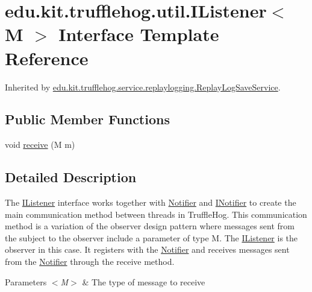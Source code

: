 \hypertarget{interfaceedu_1_1kit_1_1trufflehog_1_1util_1_1_i_listener}{}\section{edu.\+kit.\+trufflehog.\+util.\+I\+Listener$<$ M $>$ Interface Template Reference}
\label{interfaceedu_1_1kit_1_1trufflehog_1_1util_1_1_i_listener}


Inherited by \hyperlink{classedu_1_1kit_1_1trufflehog_1_1service_1_1replaylogging_1_1_replay_log_save_service}{edu.\+kit.\+trufflehog.\+service.\+replaylogging.\+Replay\+Log\+Save\+Service}.

\subsection*{Public Member Functions}
\begin{DoxyCompactItemize}
\item 
void \hyperlink{interfaceedu_1_1kit_1_1trufflehog_1_1util_1_1_i_listener_a052500b6cbdc4d0087fc44591fe32bc1}{receive} (M m)
\end{DoxyCompactItemize}


\subsection{Detailed Description}
The \hyperlink{interfaceedu_1_1kit_1_1trufflehog_1_1util_1_1_i_listener}{I\+Listener} interface works together with \hyperlink{classedu_1_1kit_1_1trufflehog_1_1util_1_1_notifier}{Notifier} and \hyperlink{interfaceedu_1_1kit_1_1trufflehog_1_1util_1_1_i_notifier}{I\+Notifier} to create the main communication method between threads in Truffle\+Hog. This communication method is a variation of the observer design pattern where messages sent from the subject to the observer include a parameter of type M. The \hyperlink{interfaceedu_1_1kit_1_1trufflehog_1_1util_1_1_i_listener}{I\+Listener} is the observer in this case. It registers with the \hyperlink{classedu_1_1kit_1_1trufflehog_1_1util_1_1_notifier}{Notifier} and receives messages sent from the \hyperlink{classedu_1_1kit_1_1trufflehog_1_1util_1_1_notifier}{Notifier} through the receive method. 


\begin{DoxyParams}{Parameters}
{\em $<$\+M$>$} & The type of message to receive \\
\hline
\end{DoxyParams}


